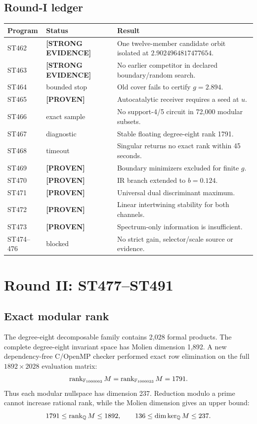\documentclass[11pt,a4paper]{article}
\theoremstyle{definition}\newtheorem{definition}[theorem]{Definition}
\theoremstyle{remark}\newtheorem{remark}[theorem]{Remark}
\newcommand{\status}[2]{\textcolor{#1}{\textbf{[#2]}}}
\newcommand{\proven}{\status{fingreen}{PROVEN}}\newcommand{\strong}{\status{finblue}{STRONG EVIDENCE}}
\begin{document}
\subsection{Round-I ledger}

\begin{longtable}{@{}p{}p{}p{}@{}}\toprule
Program & Status & Result\\\midrule\endhead
ST462 & \strong & One twelve-member candidate orbit isolated at $2.9024964817477654$.\\
ST463 & \strong & No earlier competitor in declared boundary/random search.\\
ST464 & bounded stop & Old cover fails to certify $g=2.894$.\\
ST465 & \proven & Autocatalytic receiver requires a seed at $u$.\\
ST466 & exact sample & No support-4/5 circuit in 72,000 modular subsets.\\
ST467 & diagnostic & Stable floating degree-eight rank 1791.\\
ST468 & timeout & Singular returns no exact rank within 45 seconds.\\
ST469 & \proven & Boundary minimizers excluded for finite $g$.\\
ST470 & \proven & IR branch extended to $b=0.124$.\\
ST471 & \proven & Universal dual discriminant maximum.\\
ST472 & \proven & Linear intertwining stability for both channels.\\
ST473 & \proven & Spectrum-only information is insufficient.\\
ST474--476 & blocked & No strict gain, selector/scale source or evidence.\\\bottomrule
\end{longtable}

\section{Round II: ST477--ST491}

\subsection{Exact modular rank}

The degree-eight decomposable family contains 2,028 formal products. The complete degree-eight invariant space has Molien dimension 1,892. A new dependency-free C/OpenMP checker performed exact row elimination on the full $1892\times2028$ evaluation matrix:
\[
\operatorname{rank}_{\mathbb F_{1000003}}M
=\operatorname{rank}_{\mathbb F_{1000033}}M=1791.
\]
Thus each modular nullspace has dimension 237. Reduction modulo a prime cannot increase rational rank, while the Molien dimension gives an upper bound:
\begin{equation}\label{eq:rankbounds}
1791\le\operatorname{rank}_{\mathbb Q}M\le1892,
\qquad
136\le\dim\ker_{\mathbb Q}M\le237.
\end{equation}
\end{document}
